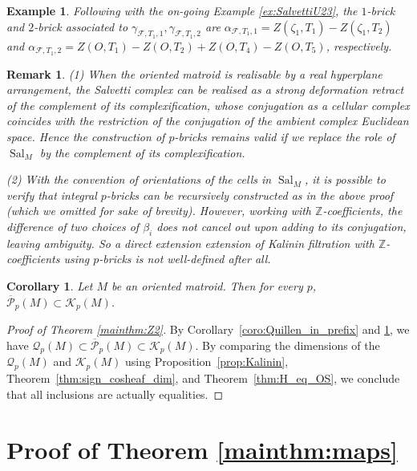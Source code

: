 \documentclass{amsart}
\newtheorem{corollary}[theorem]{Corollary}
\newtheorem{remark}[theorem]{Remark}
\newtheorem{example}[theorem]{Example}
\newcommand\Fcal{{\mathcal F}}
\newcommand\Kcal{{\mathcal K}}
\newcommand\Qcal{{\mathcal Q}}
\newcommand\Pcal{{\mathcal P}}
\newcommand\ZZ{{\mathbb Z}}
\DeclareMathOperator{\Sal}{Sal}
\begin{document}
{\begin{example} \label{ex:Kalinin} \rm
Following with the on-going Example \ref{ex:SalvettiU23}, the $1$-brick and $2$-brick associated to $\gamma_{\Fcal,T_1,1}, \gamma_{\Fcal,T_1,2}$ are $\alpha_{\Fcal,T_1,1}=Z(\zeta_1,T_1)-Z(\zeta_1,T_2)$ and $\alpha_{\Fcal,T_1,2}=Z(O,T_1)-Z(O,T_2)+Z(O,T_4)-Z(O,T_5)$, respectively.
\end{example}

\begin{remark} \label{rm:Kalinin}
\normalfont
(1) When the oriented matroid is realisable by a real hyperplane arrangement, the Salvetti complex can be realised as a strong deformation retract of the complement of its complexification, whose conjugation as a cellular complex coincides with the restriction of the conjugation of the ambient complex Euclidean space.
Hence the construction of $p$-bricks remains valid if we replace the role of $\Sal_M$ by the complement of its complexification.

(2) With the convention of orientations of the cells in $\Sal_M$, it is possible to verify that integral $p$-bricks can be recursively constructed as in the above proof (which we omitted for sake of brevity). However, working with $\ZZ$-coefficients, the difference of two choices of $\beta_i$ does not cancel out upon adding to its conjugation, leaving ambiguity. So a direct extension extension of Kalinin filtration with $\ZZ$-coefficients using $p$-bricks is not well-defined after all.
\end{remark}

\begin{corollary} \label{coro:Prefix_in_Kalinin}
Let $M$ be an oriented matroid.
Then for every $p$, $\overline{\Pcal}_p(M)\subset\Kcal_p(M)$.
\end{corollary}

\begin{proof}[Proof of Theorem \ref{mainthm:Z2}]
By Corollary~\ref{coro:Quillen_in_prefix} and \ref{coro:Prefix_in_Kalinin}, we have $\Qcal_p(M)\subset\overline{\Pcal}_p(M)\subset\Kcal_p(M)$.
By comparing the dimensions of the $\Qcal_p(M)$ and $\Kcal_p(M)$ using Proposition~\ref{prop:Kalinin}, Theorem~\ref{thm:sign_cosheaf_dim}, and Theorem~\ref{thm:H_eq_OS}, we conclude that all inclusions are actually equalities.
\end{proof}

\section{Proof of Theorem \ref{mainthm:maps}}

}
\end{document}
